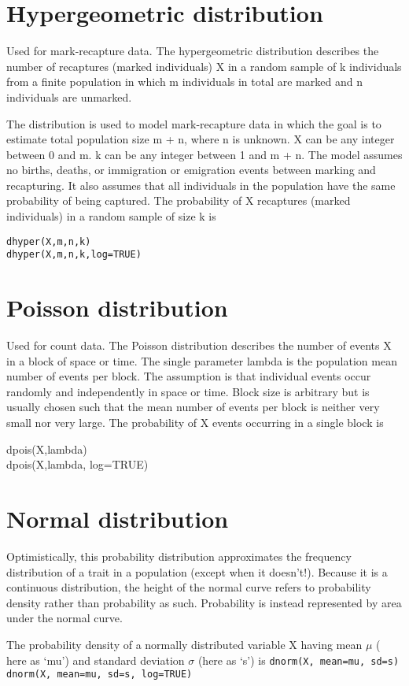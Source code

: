 \documentclass[12pt, a4paper]{article}
\theoremstyle{plain}
\theoremstyle{definition}
\theoremstyle{remark}
\begin{document}
\newpage
\section{Hypergeometric distribution}
Used for mark-recapture data. The hypergeometric distribution describes the number of recaptures (marked individuals) X in a random sample of k individuals from a finite population in which m individuals in total are marked and n individuals are unmarked.

The distribution is used to model mark-recapture data in which the goal is to estimate total population size m + n, where n is unknown. X can be any integer between 0 and m. k can be any integer between 1 and m + n. The model assumes no births, deaths, or immigration or emigration events between marking and recapturing. It also assumes that all individuals in the population have the same probability of being captured. The probability of X recaptures (marked individuals) in a random sample of size k is
\begin{framed}
\begin{verbatim}
dhyper(X,m,n,k)
dhyper(X,m,n,k,log=TRUE)
\end{verbatim}
\end{framed}
\newpage
\section{Poisson distribution}
Used for count data. The Poisson distribution describes the number of events X in a block of space or time. The single parameter lambda is the population mean number of events per block. The assumption is that individual events occur randomly and independently in space or time. Block size is arbitrary but is usually chosen such that the mean number of events per block is neither very small nor very large. The probability of X events occurring in a single block is

dpois(X,lambda)\\
dpois(X,lambda, log=TRUE)
\section{Normal distribution}
Optimistically, this probability distribution approximates the frequency distribution of a trait in a population (except when it doesn't!). Because it is a continuous distribution, the height of the normal curve refers to probability density rather than probability as such. Probability is instead represented by area under the normal curve.

The probability density of a normally distributed variable X having mean $\mu$ ( here as `mu') and standard deviation $\sigma$ (here as `s')  is
\texttt{dnorm(X, mean=mu, sd=s)}
\texttt{dnorm(X, mean=mu, sd=s, log=TRUE)}
\end{document}
